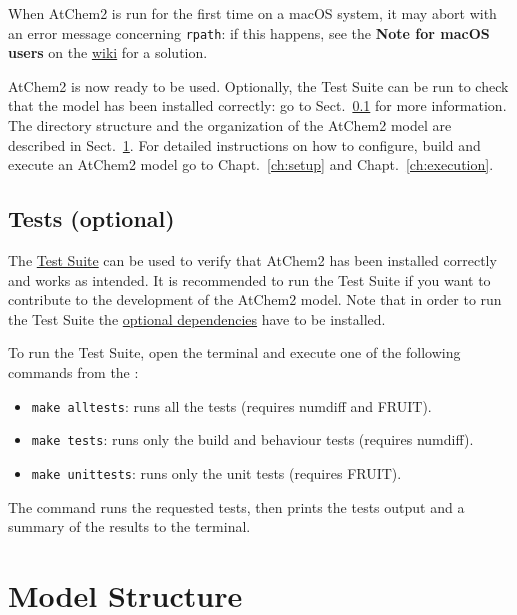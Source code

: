 When AtChem2 is run for the first time on a macOS system, it may abort
with an error message concerning \texttt{rpath}: if this happens, see
the \textbf{Note for macOS users} on the
\href{https://github.com/AtChem/AtChem2/wiki/How-to-install-AtChem2}{wiki}
for a solution.

AtChem2 is now ready to be used. Optionally, the Test Suite can be run
to check that the model has been installed correctly: go to
Sect.~\ref{subsec:tests-optional} for more information. The directory
structure and the organization of the AtChem2 model are described in
Sect.~\ref{sec:model-structure}. For detailed instructions on how to
configure, build and execute an AtChem2 model go to
Chapt.~\ref{ch:setup} and Chapt.~\ref{ch:execution}.

\subsection{Tests (optional)} \label{subsec:tests-optional}

The \hyperref[sec:test-suite]{Test Suite} can be used to verify that
AtChem2 has been installed correctly and works as intended. It is
recommended to run the Test Suite if you want to contribute to the
development of the AtChem2 model. Note that in order to run the Test
Suite the \hyperref[subsec:optional-dependencies]{optional dependencies}
have to be installed.

To run the Test Suite, open the terminal and execute one of the
following commands from the \maindir:

\begin{itemize}
\item \verb|make alltests|: runs all the tests (requires numdiff and
  FRUIT).
\item \verb|make tests|: runs only the build and behaviour tests
  (requires numdiff).
\item \verb|make unittests|: runs only the unit tests (requires
  FRUIT).
\end{itemize}

The command runs the requested tests, then prints the tests output and
a summary of the results to the terminal.

\section{Model Structure} \label{sec:model-structure}

